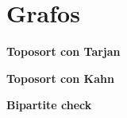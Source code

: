 \section{Grafos}
    \textbf{Toposort con Tarjan}
    

    \textbf{Toposort con Kahn}
    

    \textbf{Bipartite check}
    
